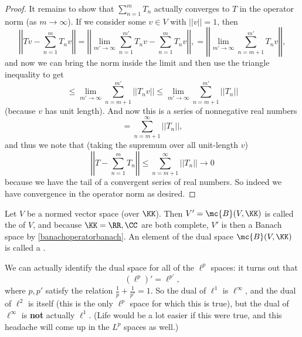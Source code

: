 \begin{proof}
It remains to show that $\sum_{n=1}^m T_n$ actually converges to $T$ in the operator norm (as $m \to \infty$). If we consider some $v \in V$ with $||v|| = 1$, then 
\[
    \boxed{\left|\left|Tv - \sum_{n=1}^m T_n v\right|\right|} = \left|\left| \lim_{m' \to \infty} \sum_{n=1}^{m'} T_n v - \sum_{n=1}^m T_n v\right|\right|, = \left|\left| \lim_{m' \to \infty} \sum_{n = m+1}^{m'} T_n v\right|\right|,
\]
and now we can bring the norm inside the limit and then use the triangle inequality to get
\[
    \le \lim_{m' \to \infty} \sum_{n = m+1}^{m'} ||T_n v|| \le \lim_{m' \to \infty} \boxed{\sum_{n=m+1}^{m'} ||T_n||}
\]
(because $v$ has unit length). And now this is a series of nonnegative real numbers
\[
    = \sum_{n = m+1}^{\infty} ||T_n||,
\]
and thus we note that (taking the supremum over all unit-length $v$)
\[
    \left|\left|T - \sum_{n=1}^m T_n\right|\right| \le \sum_{n = m+1}^{\infty} ||T_n|| \to 0
\]  
because we have the tail of a convergent series of real numbers. So indeed we have convergence in the operator norm as desired.  
\end{proof}

\begin{definition}
Let $V$ be a normed vector space (over $\KK$). Then $V' = \mc{B}(V, \KK)$ is called the  of $V$, and because $\KK = \RR, \CC$ are both complete, $V'$ is then a Banach space by \cref{banachoperatorbanach}. An element of the dual space $\mc{B}(V, \KK)$ is called a .
\end{definition}

We can actually identify the dual space for all of the $\ell^p$ spaces: it turns out that
\[
    (\ell^p)' = \ell^{p'},
\]
where $p, p'$ satisfy the relation $\frac{1}{p} + \frac{1}{p'} = 1$. So the dual of $\ell^1$ is $\ell^{\infty}$, and the dual of $\ell^2$ is itself (this is the only $\ell^p$ space for which this is true), but the dual of $\ell^{\infty}$ is \textbf{not} actually $\ell^1$. (Life would be a lot easier if this were true, and this headache will come up in the $L^p$ spaces as well.)